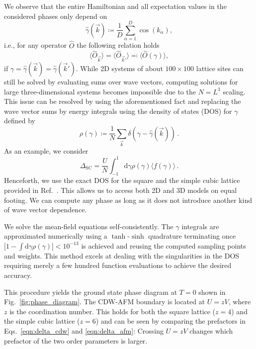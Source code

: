 \documentclass[
    reprint, 
    aps,
    preprintnumbers,
    twocolumn,
    prb,
    superscriptaddress
]{revtex4-2}
\newcommand{\vk}{\vec{k}}
\newcommand{\dgamma}{\mathrm{d}\gamma}
\begin{document}
We observe that  the entire Hamiltonian and all expectation values in the considered phases only depend on
\begin{equation}
    \widehat{\gamma}(\vk) \coloneqq \frac{1}{D} \sum_{\alpha=1}^D \cos(k_\alpha),
\end{equation}
i.e., for any operator $\widehat{O}$ the following relation holds 
\begin{equation}
    \label{eqn:equal_expecs}
    \langle \widehat{O}_{\vk} \rangle = \langle \widehat{O}_{\vk'} \rangle \eqqcolon \langle \widehat{O}( \gamma ) \rangle,
\end{equation}
if $\gamma= \widehat{\gamma}(\vk) = \widehat{\gamma}(\vk')$.
While 2D systems  of about $100\times100$ lattice sites can still be solved by evaluating sums over  wave vectors,
computing solutions for large three-dimensional systems becomes impossible due to the $N=L^3$ scaling.
This issue can be resolved by using the aforementioned fact and replacing the wave vector sums 
by energy integrals using the density of states (DOS) for $\gamma$ defined by
\begin{equation}
    \rho(\gamma) \coloneqq  \frac{1}{N} \sum_{\vk} \delta \left(\gamma - \widehat{\gamma} (\vk) \right)\,.
\end{equation}
As an example, we consider 
\begin{equation}
    \Delta_\text{SC} = \frac{U}{N} \int_{-1}^{1} \dgamma \rho(\gamma) \langle f( \gamma ) \rangle\,.
\end{equation}
Henceforth, we use the exact DOS for the square and the simple cubic lattice provided 
in Ref.\ \cite{Hanisch97}. 
This allows us to access both 2D and 3D models on equal footing.
We can compute any phase as long as it does not introduce another kind of wave vector dependence.


We solve the mean-field equations self-consistently.
The $\gamma$ integrals are approximated numerically using a $\tanh$-$\sinh$ quadrature \cite{takahasi73} 
terminating once $|1 - \int \dgamma \rho(\gamma)| < 10^{-13}$ is achieved
and reusing the computed sampling points and weights.
This method excels at dealing with the singularities in the DOS 
requiring merely a few hundred function evaluations to achieve the desired accuracy.

This procedure yields the ground state phase diagram at $T=0$ shown in Fig.\ 
\ref{fig:phase_diagram}.
The CDW-AFM boundary is located at $U = zV$, where $z$ is the coordination number.
This holds for both the square lattice ($z=4$) and the simple cubic lattice ($z=6$) and can be seen by comparing the prefactors in Eqs.\ \eqref{eqn:delta_cdw} and \eqref{eqn:delta_afm}:
Crossing $U = zV$ changes which prefactor of the two order parameters is larger.
\end{document}
